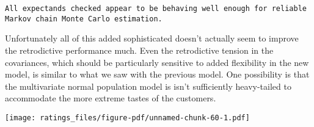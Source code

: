 \documentclass[
  letterpaper,
  DIV=11,
  numbers=noendperiod]{scrartcl}
\newenvironment{Shaded}{\begin{snugshade}}{\end{snugshade}}
\newcommand{\AttributeTok}[1]{\textcolor[rgb]{0.40,0.45,0.13}{#1}}
\newcommand{\DecValTok}[1]{\textcolor[rgb]{0.68,0.00,0.00}{#1}}
\newcommand{\FloatTok}[1]{\textcolor[rgb]{0.68,0.00,0.00}{#1}}
\newcommand{\FunctionTok}[1]{\textcolor[rgb]{0.28,0.35,0.67}{#1}}
\newcommand{\NormalTok}[1]{\textcolor[rgb]{0.00,0.23,0.31}{#1}}
\newcommand{\SpecialCharTok}[1]{\textcolor[rgb]{0.37,0.37,0.37}{#1}}
\newcommand{\StringTok}[1]{\textcolor[rgb]{0.13,0.47,0.30}{#1}}
\begin{document}
\begin{verbatim}
All expectands checked appear to be behaving well enough for reliable
Markov chain Monte Carlo estimation.
\end{verbatim}

Unfortunately all of this added sophisticated doesn't actually seem to
improve the retrodictive performance much. Even the retrodictive tension
in the covariances, which should be particularly sensitive to added
flexibility in the new model, is similar to what we saw with the
previous model. One possibility is that the multivariate normal
population model is isn't sufficiently heavy-tailed to accommodate the
more extreme tastes of the customers.

\begin{Shaded}
\end{Shaded}

\texttt{[image: ratings\_files/figure-pdf/unnamed-chunk-60-1.pdf]}
\end{document}
